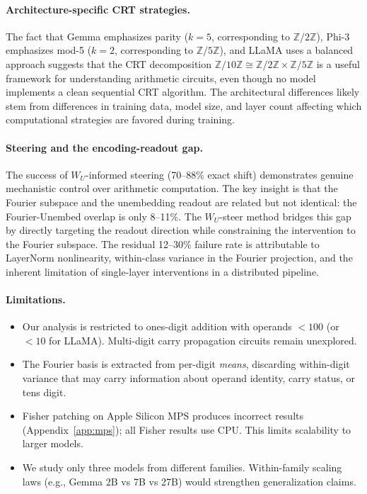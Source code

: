 \paragraph{Architecture-specific CRT strategies.} The fact that Gemma emphasizes parity ($k{=}5$, corresponding to $\mathbb{Z}/2\mathbb{Z}$), Phi-3 emphasizes mod-5 ($k{=}2$, corresponding to $\mathbb{Z}/5\mathbb{Z}$), and LLaMA uses a balanced approach suggests that the CRT decomposition $\mathbb{Z}/10\mathbb{Z} \cong \mathbb{Z}/2\mathbb{Z} \times \mathbb{Z}/5\mathbb{Z}$ is a useful framework for understanding arithmetic circuits, even though no model implements a clean sequential CRT algorithm. The architectural differences likely stem from differences in training data, model size, and layer count affecting which computational strategies are favored during training.

\paragraph{Steering and the encoding-readout gap.} The success of $W_U$-informed steering (70--88\% exact shift) demonstrates genuine mechanistic control over arithmetic computation. The key insight is that the Fourier subspace and the unembedding readout are related but not identical: the Fourier-Unembed overlap is only 8--11\%. The $W_U$-steer method bridges this gap by directly targeting the readout direction while constraining the intervention to the Fourier subspace. The residual 12--30\% failure rate is attributable to LayerNorm nonlinearity, within-class variance in the Fourier projection, and the inherent limitation of single-layer interventions in a distributed pipeline.

\paragraph{Limitations.}
\begin{itemize}
    \item Our analysis is restricted to ones-digit addition with operands $<100$ (or $<10$ for LLaMA). Multi-digit carry propagation circuits remain unexplored.
    \item The Fourier basis is extracted from per-digit \emph{means}, discarding within-digit variance that may carry information about operand identity, carry status, or tens digit.
    \item Fisher patching on Apple Silicon MPS produces incorrect results (Appendix~\ref{app:mps}); all Fisher results use CPU. This limits scalability to larger models.
    \item We study only three models from different families. Within-family scaling laws (e.g., Gemma 2B vs 7B vs 27B) would strengthen generalization claims.
\end{itemize}

